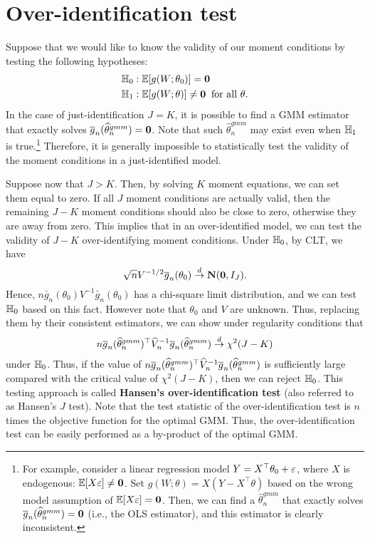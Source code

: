 \documentclass[11pt, A4paper, openany, uplatex]{book}
\begin{document}
\section{Over-identification test}

Suppose that we would like to know the validity of our moment conditions by testing the following hypotheses:
\begin{align*}
	& \mathbb{H}_0: \mathbb{E}[g(W; \theta_0)] = \mathbf{0}\\
	& \mathbb{H}_1: \mathbb{E}[g(W; \theta)] \neq \mathbf{0} \;\; \text{for all $\theta$}.
\end{align*}
In the case of just-identification $J = K$, it is possible to find a GMM estimator that exactly solves $\overline g_n(\widehat \theta_n^{gmm}) = \mathbf{0}$.
Note that such $\hat \theta_n^{gmm}$ may exist even when $\mathbb{H}_1$ is true.\footnote{
	For example, consider a linear regression model $Y = X^\top \theta_0 + \varepsilon$, where $X$ is endogenous: $\mathbb{E}[X \varepsilon] \neq \mathbf{0}$.
	Set $g(W; \theta) = X(Y - X^\top\theta)$ based on the wrong model assumption of $\mathbb{E}[X \varepsilon] = \mathbf{0}$.
	Then, we can find a $\hat \theta_n^{gmm}$ that exactly solves $\overline g_n(\widehat \theta_n^{gmm}) = \mathbf{0}$ (i.e., the OLS estimator), and this estimator is clearly inconsistent.
	}
Therefore, it is generally impossible to statistically test the validity of the moment conditions in a just-identified model.

Suppose now that $J > K$.
Then, by solving $K$ moment equations, we can set them equal to zero.
If all $J$ moment conditions are actually valid, then the remaining $J-K$ moment conditions should also be close to zero, otherwise they are away from zero.
This implies that in an over-identified model, we can test the validity of $J - K$ over-identifying moment conditions.
Under $\mathbb{H}_0$, by CLT, we have
\[
	\sqrt{n} V^{-1/2} \overline g_n (\theta_0) \overset{d}{\to} \mathbf{N}(\mathbf{0}, I_J).
\]
Hence, $n \bar g_n (\theta_0) V^{-1} \bar g_n (\theta_0)$ has a chi-square limit distribution, and we can test $\mathbb{H}_0$ based on this fact.
However note that $\theta_0$ and $V$ are unknown.
Thus, replacing them by their consistent estimators, we can show under regularity conditions that
\begin{align*}
	n \overline{g}_n(\widehat \theta_n^{gmm})^\top \widehat V_n^{-1} \overline{g}_n(\widehat \theta_n^{gmm}) \overset{d}{\to} \chi^2(J - K)
\end{align*}
under $\mathbb{H}_0$.
Thus, if the value of $n \overline{g}_n(\widehat \theta_n^{gmm})^\top \widehat V_n^{-1} \overline{g}_n(\widehat \theta_n^{gmm})$ is sufficiently large compared with the critical value of $\chi^2(J - K)$, then we can reject $\mathbb{H}_0$.
This testing approach is called \textbf{Hansen's over-identification test} (also referred to as Hansen's $J$ test).
Note that the test statistic of the over-identification test is $n$ times the objective function for the optimal GMM.
Thus, the over-identification test can be easily performed as a by-product of the optimal GMM.
\end{document}
